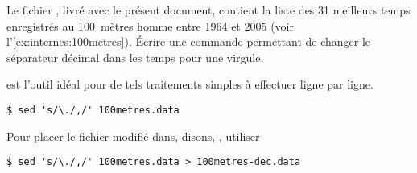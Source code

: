 \begin{exercice}
  Le fichier , livré avec le présent document,
  contient la liste des 31 meilleurs temps enregistrés au 100~mètres
  homme entre 1964 et 2005 (voir l'\autoref{ex:internes:100metres}).
  Écrire une commande  permettant de changer le séparateur
  décimal dans les temps pour une virgule.
  \begin{sol}
     est l'outil idéal pour de tels traitements simples à
    effectuer ligne par ligne.
    \begin{Schunk}
\begin{Verbatim}
$ sed 's/\./,/' 100metres.data
\end{Verbatim}
    \end{Schunk}
    Pour placer le fichier modifié dans, disons,
    , utiliser
    \begin{Schunk}
\begin{Verbatim}
$ sed 's/\./,/' 100metres.data > 100metres-dec.data
\end{Verbatim}
    \end{Schunk}
  \end{sol}
\end{exercice}

